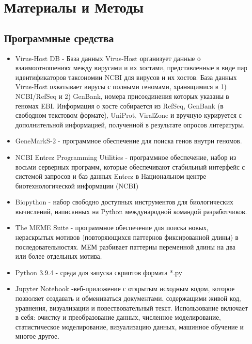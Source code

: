 \documentclass[a4paper,12pt]{article}
\begin{document}
\newpage
\section{Материалы и Методы} \label{sec:code}
\subsection{Программные средства}
\begin{itemize}
    \item Virus-Host DB - База данных Virus-Host организует данные о взаимоотношениях между вирусами и их хостами,
    представленные в виде пар идентификаторов таксономии NCBI для вирусов и их хостов. База данных Virus-Host охватывает
    вирусы с полными геномами, хранящимися в 1) NCBI/RefSeq и 2) GenBank, номера присоединения которых указаны в геномах
    EBI. Информация о хосте собирается из RefSeq, GenBank (в свободном текстовом формате), UniProt, ViralZone и вручную
    курируется с дополнительной информацией, полученной в результате опросов литературы. \cite{virus-host}
    
    \item GeneMarkS-2 - программное обеспечение для поиска генов внутри геномов. \cite{lomsad}
    
    \item NCBI Entrez Programming Utilities - программное обеспечение, набор из восьми серверных программ, которые
    обеспечивают стабильный интерфейс с системой запросов и баз данных Entrez в Национальном центре биотехнологической
    информации (NCBI) \cite{entrez}
    
    \item Biopython - набор свободно доступных инструментов для биологических вычислений, написанных на Python
    международной командой разработчиков. \cite{biopython}
    
    \item The MEME Suite - программное обеспечение для поиска новых, нераскрытых мотивов (повторяющихся паттернов
    фиксированной длины) в последовательностях. МЕМ разбивает паттерны переменной длины на два или более отдельных
    мотива. \cite{bailey}
    
    \item Python 3.9.4 - среда для запуска скриптов формата *.py \cite{python}
    
    \item Jupyter Notebook -веб-приложение с открытым исходным кодом, которое позволяет создавать и обмениваться
    документами, содержащими живой код, уравнения, визуализации и повествовательный текст. Использование включает в себя:
    очистку и преобразование данных, численное моделирование, статистическое моделирование, визуализацию данных, машинное
    обучение и многое другое. \cite{jupyter}
    

\end{itemize}
\end{document}
